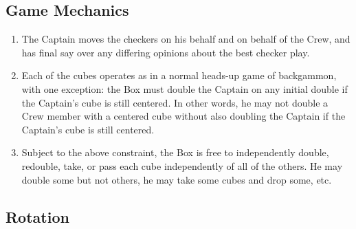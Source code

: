 \documentclass[11pt]{article}
\begin{document}
\subsection*{Game Mechanics}

\begin{enumerate}
\item The Captain moves the checkers on his behalf and on behalf of
  the Crew, and has final say over any differing opinions about the
  best checker play.

\item Each of the cubes operates as in a normal heads-up game of
  backgammon, with one exception: the Box must double the Captain on
  any initial double if the Captain's cube is still centered.  In
  other words, he may not double a Crew member with a centered cube
  without also doubling the Captain if the Captain's cube is still
  centered.

\item Subject to the above constraint, the Box is free to
  independently double, redouble, take, or pass each cube
  independently of all of the others.  He may double some but not
  others, he may take some cubes and drop some, etc.
\end{enumerate}

\subsection*{Rotation}
\end{document}
